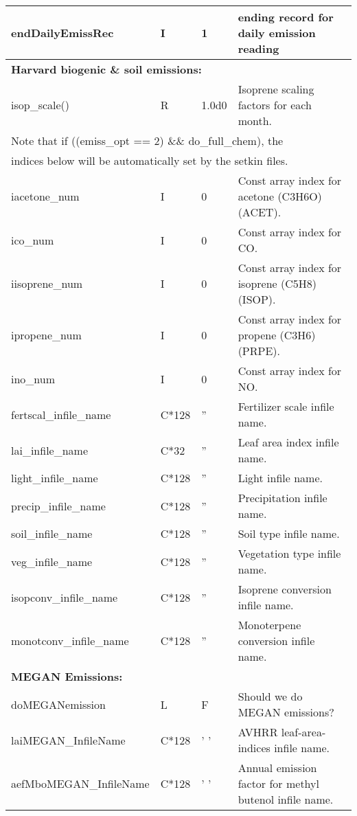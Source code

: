 {\begin{landscape}
\begin{center}
\begin{longtable}{|l|l|l|l|}
endDailyEmissRec  & I & 1 & ending    record for daily emission reading \\ \hline
\multicolumn{4}{|l|}{\bf Harvard biogenic \& soil emissions:} \\ \hline
isop\_scale()  & R & 1.0d0 & Isoprene scaling factors for each month.  \\ \hline
\multicolumn{4}{|l|}{Note that if ((emiss\_opt == 2) \&\& do\_full\_chem), the } \\
\multicolumn{4}{|l|}{indices below will be automatically set by the setkin files.} \\ \hline
iacetone\_num          & I & 0 & Const array index for acetone  (C3H6O) (ACET).  \\ \hline
ico\_num               & I & 0 & Const array index for CO.  \\ \hline
iisoprene\_num         & I & 0 & Const array index for isoprene (C5H8)  (ISOP).  \\ \hline
ipropene\_num          & I & 0 & Const array index for propene  (C3H6)  (PRPE).  \\ \hline
ino\_num               & I & 0 & Const array index for NO.  \\ \hline
fertscal\_infile\_name  & C*128 & '' & Fertilizer scale infile name.  \\ \hline
lai\_infile\_name       & C*32 & ''       & Leaf area index  infile name.  \\ \hline
light\_infile\_name     & C*128 & ''        & Light            infile name.  \\ \hline
precip\_infile\_name    & C*128 & ''    & Precipitation    infile name.  \\ \hline
soil\_infile\_name      & C*128 & ''          & Soil type        infile name.  \\ \hline
veg\_infile\_name       & C*128 & ''   & Vegetation type  infile name.  \\ \hline
isopconv\_infile\_name  & C*128 & ''     & Isoprene conversion    infile name.  \\ \hline
monotconv\_infile\_name & C*128 & ''    & Monoterpene conversion infile name.  \\ \hline
\multicolumn{4}{|l|}{\bf MEGAN Emissions:} \\ \hline
doMEGANemission   & L & F & Should we do MEGAN emissions? \\ \hline
laiMEGAN\_InfileName & C*128 & ' '&  AVHRR leaf-area-indices infile name. \\ \hline
aefMboMEGAN\_InfileName & C*128 & ' '&  Annual emission factor for methyl butenol infile name. \\ \hline

\end{longtable}
\end{center}
\end{landscape}}
